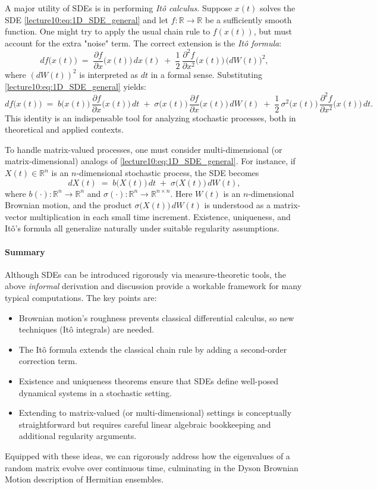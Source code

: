 \documentclass[letterpaper,11pt,oneside,reqno]{book}
\numberwithin{equation}{chapter}  %
\theoremstyle{definition}
\begin{document}
\medskip
A major utility of SDEs is in performing \emph{It\^{o} calculus}. Suppose \(x(t)\) solves the SDE \eqref{lecture10:eq:1D_SDE_general} and let \(f\colon\mathbb{R}\to\mathbb{R}\) be a sufficiently smooth function. One might try to apply the usual chain rule to \(f(x(t))\), but must account for the extra "noise" term. The correct extension is the \emph{It\^{o} formula}:
\[
df\bigl(x(t)\bigr)
\;=\;
\frac{\partial f}{\partial x}\bigl(x(t)\bigr)\,dx(t)
\;+\;\frac12\,
\frac{\partial^2 f}{\partial x^2}\bigl(x(t)\bigr)\,\bigl(dW(t)\bigr)^2,
\]
where \((dW(t))^2\) is interpreted as \(dt\) in a formal sense. Substituting \eqref{lecture10:eq:1D_SDE_general} yields:
\[
df\bigl(x(t)\bigr)
\;=\;
b\bigl(x(t)\bigr)\,\frac{\partial f}{\partial x}\bigl(x(t)\bigr)\,dt
\;+\;
\sigma\bigl(x(t)\bigr)\,\frac{\partial f}{\partial x}\bigl(x(t)\bigr)\,dW(t)
\;+\;
\frac12\,\sigma^2\bigl(x(t)\bigr)\,\frac{\partial^2 f}{\partial x^2}\bigl(x(t)\bigr)\,dt.
\]
This identity is an indispensable tool for analyzing stochastic processes, both in theoretical and applied contexts.

\medskip
To handle matrix-valued processes, one must consider multi-dimensional (or matrix-dimensional) analogs of \eqref{lecture10:eq:1D_SDE_general}. For instance, if \(X(t)\in\mathbb{R}^n\) is an \(n\)-dimensional stochastic process, the SDE becomes
\[
dX(t)
\;=\;
b\bigl(X(t)\bigr)\,dt
\;+\;
\sigma\bigl(X(t)\bigr)\,dW(t),
\]
where \(b(\cdot)\colon\mathbb{R}^n\to\mathbb{R}^n\) and \(\sigma(\cdot)\colon\mathbb{R}^n\to \mathbb{R}^{n\times n}\). Here \(W(t)\) is an \(n\)-dimensional Brownian motion, and the product \(\sigma\bigl(X(t)\bigr)\,dW(t)\) is understood as a matrix-vector multiplication in each small time increment. Existence, uniqueness, and It\^{o}’s formula all generalize naturally under suitable regularity assumptions.

\paragraph{Summary}
Although SDEs can be introduced rigorously via measure-theoretic tools, the above \emph{informal} derivation and discussion provide a workable framework for many typical computations. The key points are:
\begin{itemize}
\item Brownian motion’s roughness prevents classical differential calculus, so new techniques (It\^{o} integrals) are needed.
\item The It\^{o} formula extends the classical chain rule by adding a second-order correction term.
\item Existence and uniqueness theorems ensure that SDEs define well-posed dynamical systems in a stochastic setting.
\item Extending to matrix-valued (or multi-dimensional) settings is conceptually straightforward but requires careful linear algebraic bookkeeping and additional regularity arguments.
\end{itemize}
Equipped with these ideas, we can rigorously address how the eigenvalues of a random matrix evolve over continuous time, culminating in the Dyson Brownian Motion description of Hermitian ensembles.
\end{document}
